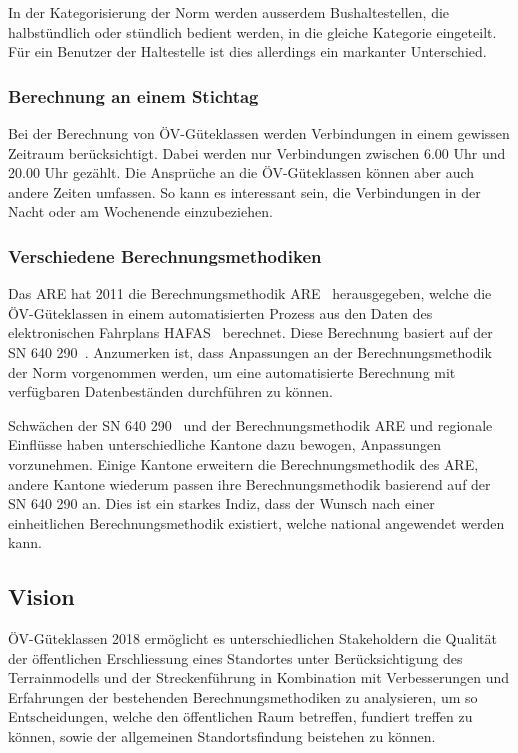 In der Kategorisierung der Norm werden ausserdem Bushaltestellen, die halbstündlich oder stündlich bedient werden, in die gleiche Kategorie eingeteilt.
Für ein Benutzer der Haltestelle ist dies allerdings ein markanter Unterschied.

\subsubsection{Berechnung an einem Stichtag}
\label{Problemstellung:Berechnung an einem Stichtag}

Bei der Berechnung von \acs{ÖV}-Güteklassen werden Verbindungen in einem gewissen Zeitraum berücksichtigt.
Dabei werden nur Verbindungen zwischen 6.00 Uhr und 20.00 Uhr gezählt.
Die Ansprüche an die \acs{ÖV}-Güteklassen können aber auch andere Zeiten umfassen.
So kann es interessant sein, die Verbindungen in der Nacht oder am Wochenende einzubeziehen.

\subsubsection{Verschiedene Berechnungsmethodiken}
\label{Problemstellung:Verschiedene Berechnungsmethodiken}

Das \acl{ARE} hat 2011 die Berechnungsmethodik \acs{ARE}~\cite{berechnung_are} herausgegeben, welche die \acs{ÖV}-Güteklassen in einem automatisierten Prozess aus den Daten des elektronischen Fahrplans HAFAS~\cite{sbb_hafas_spec} berechnet.
Diese Berechnung basiert auf der \acs{SN} 640 290~\cite{sn640290}.
Anzumerken ist, dass Anpassungen an der Berechnungsmethodik der Norm vorgenommen werden, um eine automatisierte Berechnung mit verfügbaren Datenbeständen durchführen zu können.

Schwächen der \acs{SN} 640 290~\cite{sn640290} und der Berechnungsmethodik \acs{ARE} und regionale Einflüsse haben unterschiedliche Kantone dazu bewogen, Anpassungen vorzunehmen.
Einige Kantone erweitern die Berechnungsmethodik des \acs{ARE}, andere Kantone wiederum passen ihre Berechnungsmethodik basierend auf der \acs{SN} 640 290 an.
Dies ist ein starkes Indiz, dass der Wunsch nach einer einheitlichen Berechnungsmethodik existiert, welche national angewendet werden kann.

\subsection{Vision}
\label{Einführung:Vision}

\acs{ÖV}-Güteklassen 2018 ermöglicht es unterschiedlichen Stakeholdern die Qualität der öffentlichen Erschliessung eines Standortes unter Berücksichtigung des \gls{Terrainmodell}s und der Streckenführung in Kombination mit Verbesserungen und Erfahrungen der bestehenden Berechnungsmethodiken zu analysieren, um so Entscheidungen, welche den öffentlichen Raum betreffen, fundiert treffen zu können, sowie der allgemeinen Standortsfindung beistehen zu können.

